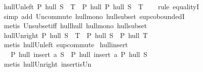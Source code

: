 \begin{isabellebody}
\ hull{\isacharunderscore}{\kern0pt}Un{\isacharunderscore}{\kern0pt}left{\isacharcolon}{\kern0pt}\ {\isachardoublequoteopen}P\ hull\ {\isacharparenleft}{\kern0pt}S\ {\isasymunion}\ T{\isacharparenright}{\kern0pt}\ {\isacharequal}{\kern0pt}\ P\ hull\ {\isacharparenleft}{\kern0pt}P\ hull\ S\ {\isasymunion}\ T{\isacharparenright}{\kern0pt}{\isachardoublequoteclose}\isanewline
%
\isadelimproof
\ \ %
\endisadelimproof
%
\isatagproof
{}\isamarkupfalse%
\ {\isacharparenleft}{\kern0pt}rule\ equalityI{\isacharparenright}{\kern0pt}\isanewline
\ \ \ \isamarkupfalse%
\ {\isacharparenleft}{\kern0pt}simp\ add{\isacharcolon}{\kern0pt}\ Un{\isacharunderscore}{\kern0pt}commute\ hull{\isacharunderscore}{\kern0pt}mono\ hull{\isacharunderscore}{\kern0pt}subset\ sup{\isachardot}{\kern0pt}coboundedI{}{\isacharparenright}{\kern0pt}\isanewline
\ \ \isamarkupfalse%
\ {\isacharparenleft}{\kern0pt}metis\ Un{\isacharunderscore}{\kern0pt}subset{\isacharunderscore}{\kern0pt}iff\ hull{\isacharunderscore}{\kern0pt}hull\ hull{\isacharunderscore}{\kern0pt}mono\ hull{\isacharunderscore}{\kern0pt}subset{\isacharparenright}{\kern0pt}%
\endisatagproof
{\isafoldproof}%
%
\isadelimproof
\isanewline
%
\endisadelimproof
\isanewline
{}\isamarkupfalse%
\ hull{\isacharunderscore}{\kern0pt}Un{\isacharunderscore}{\kern0pt}right{\isacharcolon}{\kern0pt}\ {\isachardoublequoteopen}P\ hull\ {\isacharparenleft}{\kern0pt}S\ {\isasymunion}\ T{\isacharparenright}{\kern0pt}\ {\isacharequal}{\kern0pt}\ P\ hull\ {\isacharparenleft}{\kern0pt}S\ {\isasymunion}\ P\ hull\ T{\isacharparenright}{\kern0pt}{\isachardoublequoteclose}\isanewline
%
\isadelimproof
\ \ %
\endisadelimproof
%
\isatagproof
{}\isamarkupfalse%
\ {\isacharparenleft}{\kern0pt}metis\ hull{\isacharunderscore}{\kern0pt}Un{\isacharunderscore}{\kern0pt}left\ sup{\isachardot}{\kern0pt}commute{\isacharparenright}{\kern0pt}%
\endisatagproof
{\isafoldproof}%
%
\isadelimproof
\isanewline
%
\endisadelimproof
\isanewline
{}\isamarkupfalse%
\ hull{\isacharunderscore}{\kern0pt}insert{\isacharcolon}{\kern0pt}\isanewline
\ \ \ {\isachardoublequoteopen}P\ hull\ {\isacharparenleft}{\kern0pt}insert\ a\ S{\isacharparenright}{\kern0pt}\ {\isacharequal}{\kern0pt}\ P\ hull\ {\isacharparenleft}{\kern0pt}insert\ a\ {\isacharparenleft}{\kern0pt}P\ hull\ S{\isacharparenright}{\kern0pt}{\isacharparenright}{\kern0pt}{\isachardoublequoteclose}\isanewline
%
\isadelimproof
\ \ %
\endisadelimproof
%
\isatagproof
{}\isamarkupfalse%
\ {\isacharparenleft}{\kern0pt}metis\ hull{\isacharunderscore}{\kern0pt}Un{\isacharunderscore}{\kern0pt}right\ insert{\isacharunderscore}{\kern0pt}is{\isacharunderscore}{\kern0pt}Un{\isacharparenright}{\kern0pt}%

\end{isabellebody}

